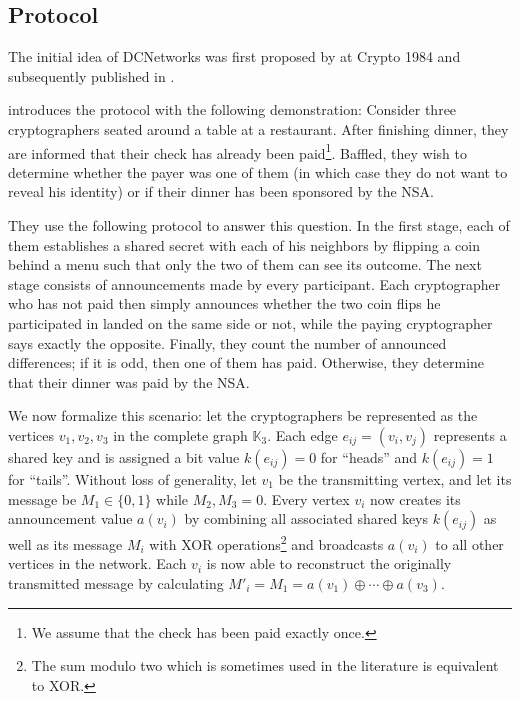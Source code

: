 
\subsection{Protocol}

The initial idea of \acp{DCNetwork} was first proposed by \citeauthor{journals/joc/Chaum88}
at Crypto 1984 and subsequently published in \citeyear{journals/joc/Chaum88} \cite{journals/joc/Chaum88}.

\citeauthor{journals/joc/Chaum88} introduces the protocol with the following demonstration:
Consider three cryptographers seated around a table at a restaurant.
After finishing dinner, they are informed that their check has already been paid\footnote{
We assume that the check has been paid exactly once.}.
Baffled, they wish to determine whether the payer was one of them (in which case
they do not want to reveal his identity) or if their dinner has been sponsored by the NSA.

They use the following protocol to answer this question.
In the first stage, each of them establishes a shared secret with each of his neighbors by flipping
a coin behind a menu such that only the two of them can see its outcome. The next stage
consists of announcements made by every participant. Each cryptographer
who has not paid then simply announces whether the two coin flips he participated
in landed on the same side or not, while the paying cryptographer says exactly the opposite.
Finally, they count the number of announced differences; if it is odd, then one of them has paid.
Otherwise, they determine that their dinner was paid by the NSA.

We now formalize this scenario: let the cryptographers be represented as the vertices 
$v_1, v_2, v_3$ in the complete graph $\mathbb{K}_3$. Each edge $e_{ij} = (v_i, v_j)$ represents a shared
key and is assigned a bit value $k(e_{ij}) = 0$ for ``heads'' and $k(e_{ij}) = 1$ for ``tails''. Without loss of generality,
let $v_1$ be the transmitting vertex, and let its message be $M_1 \in \{0, 1\}$ while $M_2, M_3 = 0$.
Every vertex $v_i$ now creates its announcement value $a(v_i)$ by combining all associated shared keys $k(e_{ij})$
as well as its message $M_i$ with XOR operations\footnote{
The sum modulo two which is sometimes used in the literature is equivalent to XOR.}
and broadcasts $a(v_i)$ to all other vertices in the network. Each $v_i$ is now able to
reconstruct the originally transmitted message by calculating
$M'_i = M_1 = a(v_1) \oplus \cdots \oplus a(v_3)$.

